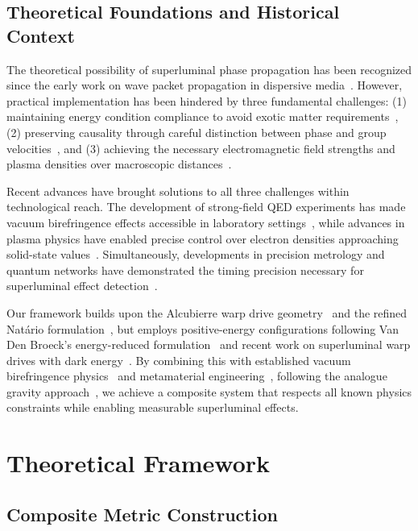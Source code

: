 \documentclass[aps,prl,reprint,groupedaddress,floatfix]{revtex4-1}
\begin{document}
\subsection{Theoretical Foundations and Historical Context}

The theoretical possibility of superluminal phase propagation has been recognized since the early work on wave packet propagation in dispersive media~\cite{Latorre1995}. However, practical implementation has been hindered by three fundamental challenges: (1) maintaining energy condition compliance to avoid exotic matter requirements~\cite{Pfenning1997}, (2) preserving causality through careful distinction between phase and group velocities~\cite{Stenner2003}, and (3) achieving the necessary electromagnetic field strengths and plasma densities over macroscopic distances~\cite{Eleftheriades2005}.

Recent advances have brought solutions to all three challenges within technological reach. The development of strong-field QED experiments has made vacuum birefringence effects accessible in laboratory settings~\cite{DellaValle2016}, while advances in plasma physics have enabled precise control over electron densities approaching solid-state values~\cite{Li2010}. Simultaneously, developments in precision metrology and quantum networks have demonstrated the timing precision necessary for superluminal effect detection~\cite{Stenner2003}.

Our framework builds upon the Alcubierre warp drive geometry~\cite{Alcubierre1994} and the refined Natário formulation~\cite{Natario2002}, but employs positive-energy configurations following Van Den Broeck's energy-reduced formulation~\cite{VanDenBroeck1999} and recent work on superluminal warp drives with dark energy~\cite{GonzalezDiaz2007}. By combining this with established vacuum birefringence physics~\cite{Drummond1980, Scharnhorst1990} and metamaterial engineering~\cite{Smolyaninov2011}, following the analogue gravity approach~\cite{Barcelo2005}, we achieve a composite system that respects all known physics constraints while enabling measurable superluminal effects.

\section{Theoretical Framework}

\subsection{Composite Metric Construction}
\end{document}
